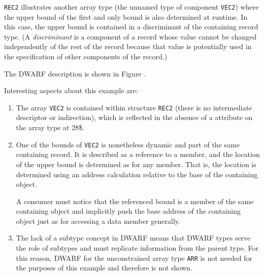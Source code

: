 \texttt{REC2} illustrates another array type (the unnamed type of
component \texttt{VEC2}) where the upper bound of the first and only
bound is also determined at runtime. In this case, the upper
bound is contained in a discriminant of the containing record
type. (A \textit{discriminant} is a component of a record whose value
cannot be changed independently of the rest of the record
because that value is potentially used in the specification
of other components of the record.)

The DWARF description is shown in 
Figure .


Interesting aspects about this example are:
\begin{enumerate}[1. ]
\item The array \texttt{VEC2} is  contained within structure
\texttt{REC2} (there is no intermediate descriptor or indirection),
which is reflected in the absence of a \DWATdatalocation{}
attribute on the array type at 28\$.

\item One of the bounds of \texttt{VEC2} is nonetheless dynamic and part of
the same containing record. It is described as a reference to
a member, and the location of the upper bound is determined
as for any member. That is, the location is determined using
an address calculation relative to the base of the containing
object.  

A consumer must notice that the referenced bound is a
member of the same containing object and implicitly push the
base address of the containing object just as for accessing
a data member generally.

\item The lack of a subtype concept in DWARF means that DWARF types
serve the role of subtypes and must replicate information from
the parent type. For this reason, DWARF for
the unconstrained array type \texttt{ARR} is not needed for the purposes
of this example and therefore is not shown.
\end{enumerate}

